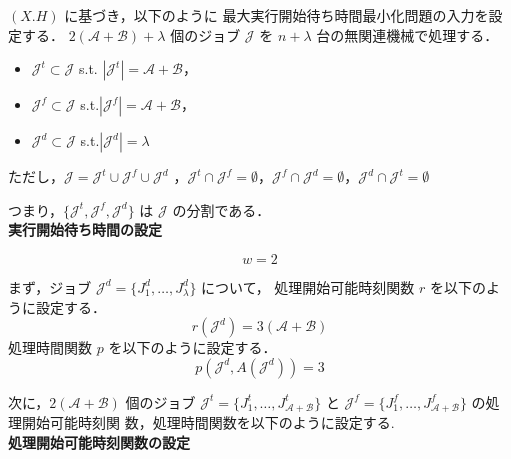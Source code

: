 \documentclass[12pt]{optlab-bachelor}
\begin{document}
  $(X.H)$ に基づき，以下のように 最大実行開始待ち時間最小化問題の入力を設定する．
  $2(\mathcal{A} + \mathcal{B}) + \lambda$ 個のジョブ $\mathcal{J}$ を
  $n + \lambda$ 台の無関連機械で処理する．
  \begin{itemize}
    \item $\mathcal{J}^t \subset \mathcal{J}$ s.t. $|\mathcal{J}^t| =
    \mathcal{A}  + \mathcal{B}$，
    \item $\mathcal{J}^f \subset \mathcal{J}$
    s.t.$|\mathcal{J}^f| = \mathcal{A}  + \mathcal{B}$，
    \item $\mathcal{J}^d \subset \mathcal{J}$ s.t.$|\mathcal{J}^d| =
    \lambda$
  \end{itemize}
  ただし，$\mathcal{J} = \mathcal{J}^t \cup \mathcal{J}^f \cup
  \mathcal{J}^d$ ，$\mathcal{J}^t \cap \mathcal{J}^f = \emptyset$，$\mathcal{J}^f \cap \mathcal{J}^d = \emptyset$，$\mathcal{J}^d \cap \mathcal{J}^t = \emptyset$

  つまり，$\{\mathcal{J}^t, \mathcal{J}^f,\mathcal{J}^d\}$ は $\mathcal{J}$ の分割である．\\

  \noindent \textbf{実行開始待ち時間の設定}

  $$w = 2$$

  まず，ジョブ $\mathcal{J}^d = \{J^d_1,\ldots,J^d_{\lambda}\}$ について，
  処理開始可能時刻関数 $r$ を以下のように設定する．
  $$r(\mathcal{J}^d) = 3(\mathcal{A} + \mathcal{B})$$
  処理時間関数 $p$ を以下のように設定する．
  $$p(\mathcal{J}^d, A(\mathcal{J}^d)) = 3$$

  次に，$2(\mathcal{A} + \mathcal{B})$ 個のジョブ $\mathcal{J}^t =
  \{J^t_1,\ldots,J^t_{\mathcal{A} + \mathcal{B}}\}$ と $\mathcal{J}^f =
  \{J^f_1,\ldots,J^f_{\mathcal{A} + \mathcal{B}}\}$ の処理開始可能時刻関
  数，処理時間関数を以下のように設定する.\\

  \noindent \textbf{処理開始可能時刻関数の設定}
\end{document}
